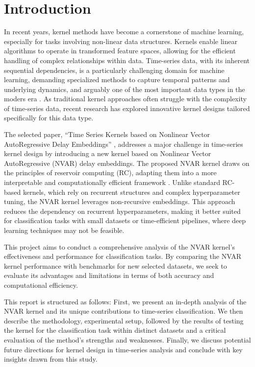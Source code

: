 \chapter{Introduction} \label{chap:intro}

In recent years, kernel methods have become a cornerstone of machine learning, especially for tasks involving non-linear data structures. Kernels enable linear algorithms to operate in transformed feature spaces, allowing for the efficient handling of complex relationships within data. Time-series data, with its inherent sequential dependencies, is a particularly challenging domain for machine learning, demanding specialized methods to capture temporal patterns and underlying dynamics, and arguably one of the most important data types in the moders era \cite{hamilton1994, strogatz2018, zhang2017, zeroual2020}. As traditional kernel approaches often struggle with the complexity of time-series data, recent research has explored innovative kernel designs tailored specifically for this data type.

The selected paper, ``Time Series Kernels based on Nonlinear Vector AutoRegressive Delay Embeddings'' \cite{felice2023}, addresses a major challenge in time-series kernel design by introducing a new kernel based on Nonlinear Vector AutoRegressive (NVAR) delay embeddings. The proposed NVAR kernel draws on the principles of reservoir computing (RC), adapting them into a more interpretable and computationally efficient framework \cite{bollt2021}. Unlike standard RC-based kernels, which rely on recurrent structures and complex hyperparameter tuning, the NVAR kernel leverages non-recursive embeddings. This approach reduces the dependency on recurrent hyperparameters, making it better suited for classification tasks with small datasets or time-efficient pipelines, where deep learning techniques may not be feasible.

This project aims to conduct a comprehensive analysis of the NVAR kernel's effectiveness and performance for classification tasks. By comparing the NVAR kernel performance with benchmarks for new selected datasets, we seek to evaluate its advantages and limitations in terms of both accuracy and computational efficiency.

This report is structured as follows: First, we present an in-depth analysis of the NVAR kernel and its unique contributions to time-series classification. We then describe the methodology, experimental setup, followed by the results of testing the kernel for the classification task within distinct datasets and a critical evaluation of the method's strengths and weaknesses. Finally, we discuss potential future directions for kernel design in time-series analysis and conclude with key insights drawn from this study.
